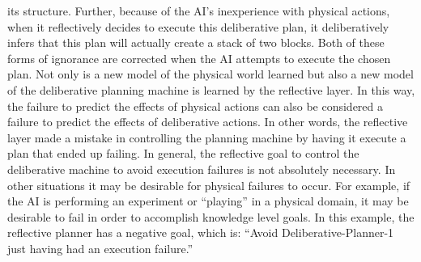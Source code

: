 its structure.  Further, because of the AI's inexperience with
physical actions, when it reflectively decides to execute this
deliberative plan, it deliberatively infers that this plan will
actually create a stack of two blocks.  Both of these forms of
ignorance are corrected when the AI attempts to execute the chosen
plan.  Not only is a new model of the physical world learned but also
a new model of the deliberative planning machine is learned by the
reflective layer.  In this way, the failure to predict the effects of
physical actions can also be considered a failure to predict the
effects of deliberative actions.  In other words, the reflective layer
made a mistake in controlling the planning machine by having it
execute a plan that ended up failing.  In general, the reflective goal
to control the deliberative machine to avoid execution failures is not
absolutely necessary.  In other situations it may be desirable for
physical failures to occur.  For example, if the AI is performing an
experiment or ``playing'' in a physical domain, it may be desirable to
fail in order to accomplish knowledge level goals.  In this example,
the reflective planner has a negative goal, which is: ``Avoid
Deliberative-Planner-1 just having had an execution failure.''
